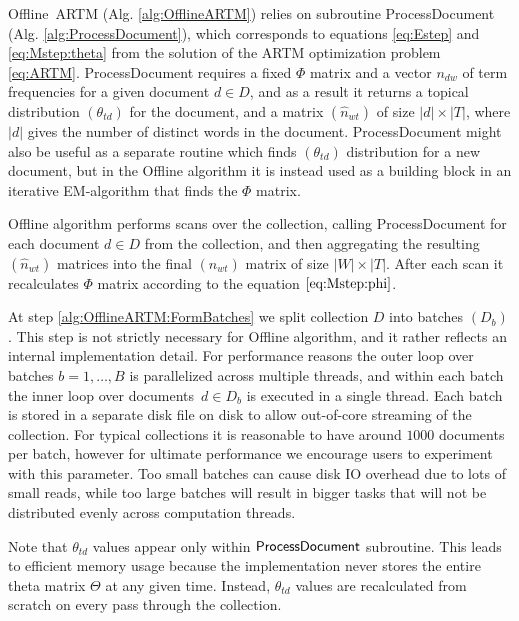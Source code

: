\documentclass[russian,english]{llncs}
\newcommand{\kw}[1]{\mbox{\textsf{#1}}}
\begin{document}
\kw{Offline ARTM} (Alg. \ref{alg:OfflineARTM}) relies on subroutine
\kw{ProcessDocument} (Alg. \ref{alg:ProcessDocument}),
which corresponds to equations \eqref{eq:Estep} and \eqref{eq:Mstep:theta}
from the solution of the ARTM optimization problem \eqref{eq:ARTM}.
\kw{ProcessDocument} requires a fixed $\Phi$ matrix
and a vector $n_{dw}$ of term frequencies for a given document $d \in D$,
and as a result it returns a topical distribution $(\theta_{td})$ for the document,
and a matrix $(\hat n_{wt})$ of size $|d| \times |T|$,
where $|d|$ gives the number of distinct words in the document.
\kw{ProcessDocument} might also be useful as a separate routine which finds $(\theta_{td})$ distribution for a new document,
but in the \kw{Offline} algorithm it is instead used as a building block in an iterative EM-algorithm that finds the $\Phi$ matrix.

\kw{Offline} algorithm performs scans over the collection, calling \kw{ProcessDocument}
for each document $d \in D$ from the collection,
and then aggregating the resulting $(\hat n_{wt})$ matrices into the final $(n_{wt})$ matrix of size $|W| \times |T|$.
After each scan it recalculates $\Phi$ matrix according to the equation $\eqref{eq:Mstep:phi}$.


At step \ref{alg:OfflineARTM:FormBatches} we split collection $D$ into batches $(D_b)$.
This step is not strictly necessary for \kw{Offline} algorithm,
and it rather reflects an internal implementation detail.
For performance reasons the outer loop over batches $b = 1, \dots, B$ is parallelized across multiple threads,
and within each batch the inner loop over documents~$d \in D_b$
is executed in a single thread.
Each batch is stored in a separate disk file on disk to allow out-of-core streaming of the collection.
For typical collections it is reasonable to have around $1000$ documents per batch,
however for ultimate performance we encourage users to experiment with this parameter.
Too small batches can cause disk IO overhead due to lots of small reads,
while too large batches will result in bigger tasks that will not be distributed evenly across computation threads.

Note that $\theta_{td}$ values appear only within $\kw{ProcessDocument}$ subroutine.
This leads to efficient memory usage because the implementation never stores the entire theta matrix $\Theta$ at any given time.
Instead, $\theta_{td}$ values are recalculated from scratch on every pass through the collection.
\end{document}
